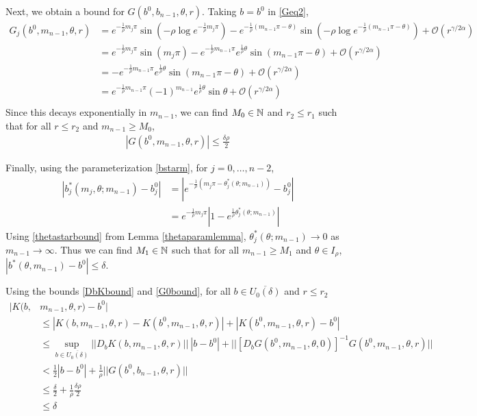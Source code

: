 \documentclass[thesis.tex]{subfiles}
\begin{document}
Next, we obtain a bound for $G(b^0, b_{n-1}, \theta, r)$. Taking $b = b^0$ in \eqref{Geq2},
\begin{align*}
G_j(b^0, m_{n-1}, \theta, r) &= e^{-\frac{1}{\rho}m_j \pi} \sin \left( -\rho \log e^{-\frac{1}{\rho}m_j \pi} \right) - e^{-\frac{1}{\rho}(m_{n-1}\pi - \theta)} \sin \left( -\rho \log e^{-\frac{1}{\rho}(m_{n-1}\pi - \theta)} \right) + \mathcal{O}(r^{\gamma / 2 \alpha}) \\
&= e^{-\frac{1}{\rho}m_j \pi} \sin \left( m_j \pi \right) - e^{-\frac{1}{\rho} m_{n-1}\pi } e^{\frac{1}{\rho}\theta } \sin \left(m_{n-1} \pi - \theta \right) + \mathcal{O}(r^{\gamma / 2 \alpha}) \\
&= -e^{-\frac{1}{\rho} m_{n-1}\pi } e^{\frac{1}{\rho}\theta } \sin \left(m_{n-1} \pi - \theta \right) + \mathcal{O}(r^{\gamma / 2 \alpha}) \\
&= e^{-\frac{1}{\rho} m_{n-1}\pi } (-1)^{m_{n-1}} e^{\frac{1}{\rho}\theta } \sin \theta + \mathcal{O}(r^{\gamma / 2 \alpha}) \\
\end{align*}
Since this decays exponentially in $m_{n-1}$, we can find $M_0 \in {\mathbb N}$ and $r_2 \leq r_1$ such that for all $r \leq r_2$ and $m_{n-1} \geq M_0$,
\begin{align}\label{G0bound}
|G(b^0, m_{n-1}, \theta, r)| \leq \frac{\delta \rho}{2}
\end{align}

Finally, using the parameterization \eqref{bstarm}, for $j = 0, \dots, n-2$,
\begin{align*}
| b_j^*(m_j, \theta; m_{n-1}) - b_j^0| &=
| e^{-\frac{1}{\rho}(m_j \pi - \theta_j^*(\theta; m_{n-1}))} - b_j^0 | \\
&= e^{-\frac{1}{\rho}m_j \pi}| 1 - e^{\frac{1}{\rho} \theta_j^*(\theta; m_{n-1})}| 
\end{align*}
Using \eqref{thetastarbound} from Lemma \ref{thetaparamlemma}, $\theta_j^*(\theta; m_{n-1}) \rightarrow 0$ as $m_{n-1} \rightarrow \infty$. Thus we can find $M_1 \in {\mathbb N}$ such that for all $m_{n-1} \geq M_1$ and $\theta \in I_\rho$, $|b^*(\theta, m_{n-1}) - b^0| \leq \delta$.

Using the bounds \eqref{DbKbound} and \eqref{G0bound}, for all $b \in \overline{U_0(\delta)}$ and $r \leq r_2$
\begin{align*}
|K(b, &m_{n-1}, \theta, r) - b^0| \\
&\leq |K(b, m_{n-1}, \theta, r) - K(b^0, m_{n-1}, \theta, r)| + |K(b^0, m_{n-1}, \theta, r) - b^0| \\ 
&\leq \sup_{b\in \overline{U_0(\delta)}}||D_b K(b, m_{n-1}, \theta, r)||\:|b - b^0| 
+ || [D_b G(b^0, m_{n-1}, \theta, 0)]^{-1} G(b^0, m_{n-1}, \theta, r) || \\
&< \frac{1}{2} |b - b^0| + \frac{1}{\rho} ||G(b^0, b_{n-1}, \theta, r) ||  \\
&\leq \frac{\delta}{2} + \frac{1}{\rho}\frac{\delta \rho}{2} \\
&\leq \delta
\end{align*} 
\end{document}
